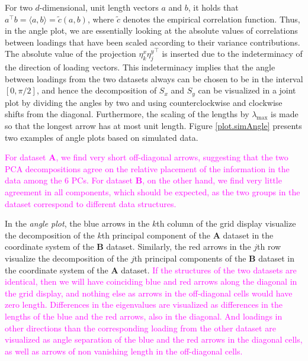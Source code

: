 \documentclass[a4paper,12pt]{article}
\newcommand{\hl}[1]{\textcolor{magenta}{#1}}
\begin{document}
For two $d$-dimensional, unit length vectors $a$ and $b$, it holds that $ a^\top b = \langle a, b \rangle = \tilde{c}(a,b)$, where $\tilde{c}$ denotes the empirical correlation function. Thus, in the angle plot, we are essentially looking at the absolute values of correlations between loadings that have been scaled according to their variance contributions. The absolute value of the projection $\eta_{k}^x {\eta_{j}^y}^\top$ is inserted due to the indeterminacy of the direction of loading vectors. This indeterminacy implies that the angle between loadings from the two datasets always can be chosen to be in the interval $[0,\pi/2]$, and hence the decomposition of $S_x$ and $S_y$ can be visualized in a joint plot by dividing the angles by two and using counterclockwise and clockwise shifts from the diagonal. Furthermore, the scaling of the lengths by $\lambda_{\max}$ is made so that the longest arrow has at most unit length. Figure \ref{plot.simAngle} presents two examples of angle plots based on simulated data.


\hl{For dataset $\mathbf{A}$, we find very short off-diagonal arrows, suggesting that the two PCA decompositions agree on the relative placement of the information in  the data among the 6 PCs.  For dataset $\mathbf{B}$, on the other hand, we find very little agreement in all components, which should be expected, as the two groups in the dataset correspond to different data structures.}

In the \emph{angle plot}, the blue arrows in the $k$th column of the grid display visualize the decomposition of the $k$th principal component of the $\mathbf{A}$ dataset in the coordinate system of the $\mathbf{B}$ dataset. Similarly, the red arrows in the $j$th row visualize the decomposition of the $j$th principal components of the $\mathbf{B}$ dataset in the coordinate system of the $\mathbf{A}$ dataset. \hl{If the structures of the two datasets are identical, then we will have coinciding blue and red arrows along the diagonal in the grid display, and nothing else as arrows in the off-diagonal cells would have zero length. Differences in the eigenvalues are visualized as differences in the lengths of the blue and the red arrows, also in the diagonal. And loadings in other directions than the corresponding loading from the other dataset are visualized as angle separation of the blue and the red arrows in the diagonal cells, as well as arrows of non vanishing length in the off-diagonal cells.}
\end{document}
